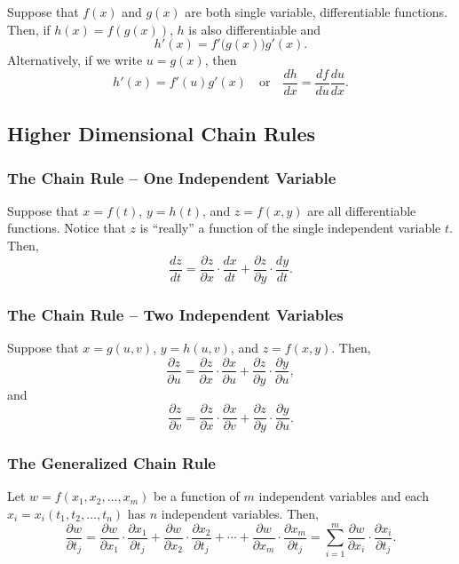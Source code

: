 Suppose that \(f(x)\) and \(g(x)\) are both single variable, differentiable functions. Then, if \(h(x) = f(g(x))\), \(h\) is also differentiable and
\[
h'(x) = f'\bigl(g(x)\bigr)g'(x).
\]
Alternatively, if we write \(u = g(x)\), then
\[
h'(x) = f'(u)g'(x) \quad \text{or} \quad \dfrac{dh}{dx} = \dfrac{df}{du}\dfrac{du}{dx}.
\]
\subsection{Higher Dimensional Chain Rules}

\subsubsection{The Chain Rule – One Independent Variable}

Suppose that \(x = f(t)\), \(y = h(t)\), and \(z = f(x, y)\) are all differentiable functions. Notice that \(z\) is “really” a function of the single independent variable \(t\). Then,
\[
\dfrac{dz}{dt} = \dfrac{\partial z}{\partial x} \cdot \dfrac{dx}{dt} + \dfrac{\partial z}{\partial y} \cdot \dfrac{dy}{dt}.
\]
\subsubsection{The Chain Rule – Two Independent Variables}

Suppose that \(x = g(u, v)\), \(y = h(u, v)\), and \(z = f(x, y)\). Then,
\[
\dfrac{\partial z}{\partial u} = \dfrac{\partial z}{\partial x} \cdot \dfrac{\partial x}{\partial u} + \dfrac{\partial z}{\partial y} \cdot \dfrac{\partial y}{\partial u},
\]
and
\[
\dfrac{\partial z}{\partial v} = \dfrac{\partial z}{\partial x} \cdot \dfrac{\partial x}{\partial v} + \dfrac{\partial z}{\partial y} \cdot \dfrac{\partial y}{\partial u}.
\]
\subsubsection{The Generalized Chain Rule}

Let \(w = f(x_{1}, x_{2}, \ldots, x_{m})\) be a function of \(m\) independent variables and each \(x_{i} = x_{i}(t_{1}, t_{2}, \ldots, t_{n})\) has \(n\) independent variables. Then,
\[
\dfrac{\partial w}{\partial t_{j}} = \dfrac{\partial w}{\partial x_{1}} \cdot \dfrac{\partial x_{1}}{\partial t_{j}} + \dfrac{\partial w}{\partial x_{2}} \cdot \dfrac{\partial x_{2}}{\partial t_{j}} + \cdots + \dfrac{\partial w}{\partial x_{m}} \cdot \dfrac{\partial x_{m}}{\partial t_{j}} = \sum_{i=1}^{m} \dfrac{\partial w}{\partial x_{i}} \cdot \dfrac{\partial x_{i}}{\partial t_{j}}.
\]

